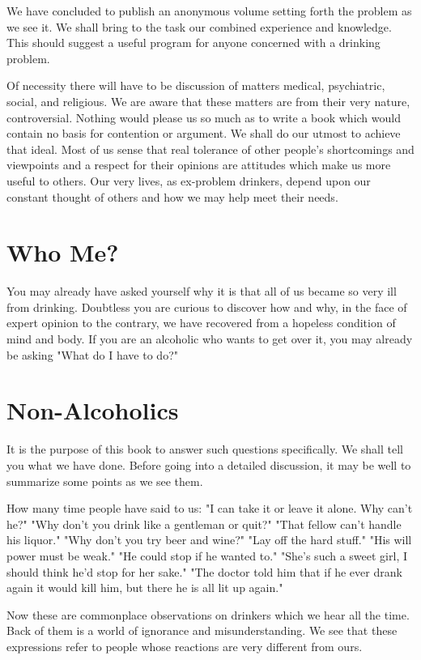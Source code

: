 We have concluded to publish an anonymous volume setting forth the problem as we see it. 
We shall bring to the task our combined experience and knowledge. 
This should suggest a useful program for anyone concerned with a drinking problem.

Of necessity there will have to be discussion of matters medical, psychiatric, social, and religious. 
We are aware that these matters are from their very nature, controversial. 
Nothing would please us so much as to write a book which would contain no basis for contention or argument. 
We shall do our utmost to achieve that ideal. 
Most of us sense that real tolerance of other people's shortcomings and viewpoints and a respect for their opinions are attitudes which make us more useful to others. 
Our very lives, as ex-problem drinkers, depend upon our constant thought of others and how we may help meet their needs.


\section{Who Me?}

You may already have asked yourself why it is that all of us became so very ill from drinking. 
Doubtless you are curious to discover how and why, in the face of expert opinion to the contrary, we have recovered from a hopeless condition of mind and body. 
If you are an alcoholic who wants to get over it, you may already be asking 
"What do I have to do?"


\section{Non-Alcoholics}

It is the purpose of this book to answer such questions specifically. 
We shall tell you what we have done. 
Before going into a detailed discussion, it may be well to summarize some points as we see them.

How many time people have said to us: 
"I can take it or leave it alone. Why can't he?" 
"Why don't you drink like a gentleman or quit?" 
"That fellow can't handle his liquor." 
"Why don't you try beer and wine?" 
"Lay off the hard stuff." 
"His will power must be weak." 
"He could stop if he wanted to." 
"She's such a sweet girl, I should think he'd stop for her sake." 
"The doctor told him that if he ever drank again it would kill him, but there he is all lit up again."

Now these are commonplace observations on drinkers which we hear all the time. 
Back of them is a world of ignorance and misunderstanding. 
We see that these expressions refer to people whose reactions are very different from ours.

